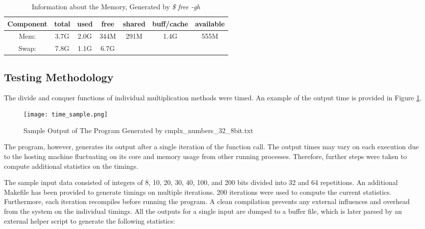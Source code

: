 \documentclass[usletter, 12pt]{article}
\begin{document}
        \begin{table}[h]
            \caption{Information about the Memory, Generated by \textit{\$ free -gh}}
            \centering
            \begin{tabular*}{400pt}{@{\extracolsep{\fill}} ccccccc}

            \textbf{Component} & \textbf{total} & \textbf{used} & \textbf{free} & \textbf{shared} & \textbf{buff/cache} & \textbf{available} \\
            \hline
            Mem: & 3.7G & 2.0G & 344M & 291M & 1.4G & 555M \\
            Swap: & 7.8G & 1.1G & 6.7G & & & \\
            \end{tabular*}
        \end{table}


        \subsection{Testing Methodology}
        The divide and conquer functions of individual multiplication methods were timed. An example of the output time is provided in Figure \ref{time_sample}.

        \begin{figure}[ht]
            \begin{center}
                \texttt{[image: time\_sample.png]}
                \caption{Sample Output of The Program Generated by cmplx\_numbers\_32\_8bit.txt} \label{time_sample}
            \end{center}
        \end{figure}

        The program, however, generates its output after a single iteration of the function call. The output times may vary on each execution due to the hosting machine fluctuating on its core and memory usage from other running processes. Therefore, further steps were taken to compute additional statistics on the timings.

        The sample input data consisted of integers of 8, 10, 20, 30, 40, 100, and 200 bits divided into 32 and 64 repetitions. An additional Makefile has been provided to generate timings on multiple iterations. 200 iterations were used to compute the current statistics. Furthermore, each iteration recompiles before running the program. A clean compilation prevents any external influences and overhead from the system on the individual timings. All the outputs for a single input are dumped to a buffer file, which is later parsed by an external helper script to generate the following statistics:
\end{document}
